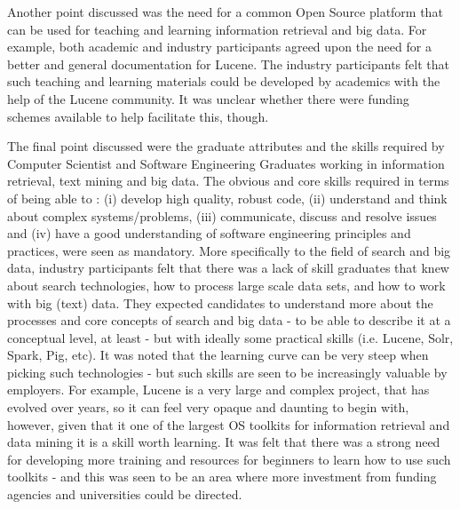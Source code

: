 
Another point discussed was the need for a common Open Source platform that can be used for teaching and learning information retrieval and big data. 
For example, both academic and industry participants agreed upon the need for a better and general documentation for Lucene. The industry participants felt that such teaching and learning materials could be developed by academics with the help of the Lucene community. It was unclear whether there were funding schemes available to help facilitate this, though.


The final point discussed were the graduate attributes and the skills required by Computer Scientist and Software Engineering Graduates working in information retrieval, text mining and big data. 
The obvious and core skills required in terms of being able to : (i) develop high quality, robust code, (ii) understand and think about complex systems/problems, (iii) communicate, discuss and resolve issues and (iv) have a good understanding of software engineering principles and practices, were seen as mandatory. 
More specifically to the field of search and big data, industry participants felt that there was a lack of skill graduates that knew about search technologies, how to process large scale data sets, and how to work with big (text) data. 
They expected candidates to understand more about the processes and core concepts of search and big data - to be able to describe it at a conceptual level, at least - but with ideally some practical skills (i.e. Lucene, Solr, Spark, Pig, etc). 
It was noted that the learning curve can be very steep when picking such technologies - but such skills are seen to be increasingly valuable by employers. 
For example, Lucene is a very large and complex project, that has evolved over years, so it can feel very opaque and daunting to begin with, however, given that it one of the largest OS toolkits for information retrieval and data mining it is a skill worth learning. 
It was felt that there was a strong need for developing more training and resources for beginners to learn how to use such toolkits - and this was seen to be an area where more investment from funding agencies and universities could be directed. 







